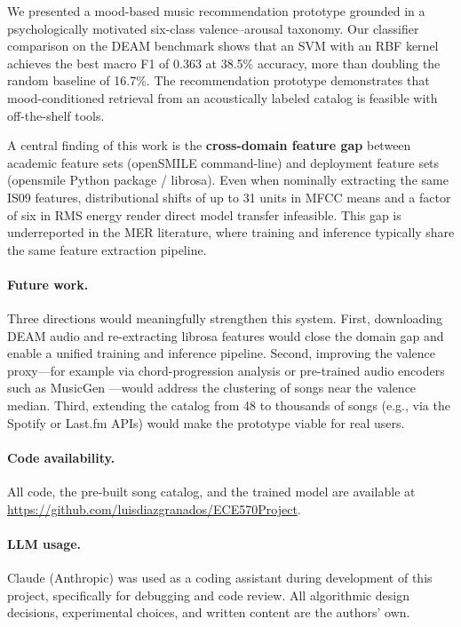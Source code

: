 \documentclass{article}
\begin{document}
We presented a mood-based music recommendation prototype grounded in a
psychologically motivated six-class valence--arousal taxonomy.
Our classifier comparison on the DEAM benchmark shows that an SVM with an
RBF kernel achieves the best macro F1 of 0.363 at 38.5\% accuracy,
more than doubling the random baseline of 16.7\%.
The recommendation prototype demonstrates that mood-conditioned retrieval
from an acoustically labeled catalog is feasible with off-the-shelf tools.

A central finding of this work is the \textbf{cross-domain feature gap}
between academic feature sets (openSMILE command-line) and deployment feature
sets (opensmile Python package / librosa).
Even when nominally extracting the same IS09 features, distributional
shifts of up to 31 units in MFCC means and a factor of six in RMS energy
render direct model transfer infeasible.
This gap is underreported in the MER literature, where training and inference
typically share the same feature extraction pipeline.

\paragraph{Future work.}
Three directions would meaningfully strengthen this system.
First, downloading DEAM audio and re-extracting librosa features would close
the domain gap and enable a unified training and inference pipeline.
Second, improving the valence proxy---for example via chord-progression
analysis or pre-trained audio encoders such as MusicGen
\citep{copet2023musicgen}---would address the clustering of songs near the
valence median.
Third, extending the catalog from 48 to thousands of songs (e.g., via the
Spotify or Last.fm APIs) would make the prototype viable for real users.

\paragraph{Code availability.}
All code, the pre-built song catalog, and the trained model are available at
\url{https://github.com/luisdiazgranados/ECE570Project}.

\paragraph{LLM usage.}
Claude (Anthropic) was used as a coding assistant during development of this
project, specifically for debugging and code review. All algorithmic design
decisions, experimental choices, and written content are the authors' own.

%


%
\end{document}
